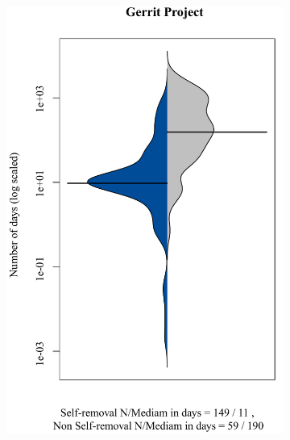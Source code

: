 \begin{figure}[t]
\begin{subfigure}[b]{0.193\textwidth}
		\includegraphics[width=\textwidth]{ben_Gerrit.pdf}
		\label{fig:removal_comparison_gerrit} 
	\end{subfigure}
	\begin{subfigure}[b]{0.195\textwidth}

\end{subfigure}
\end{figure}
